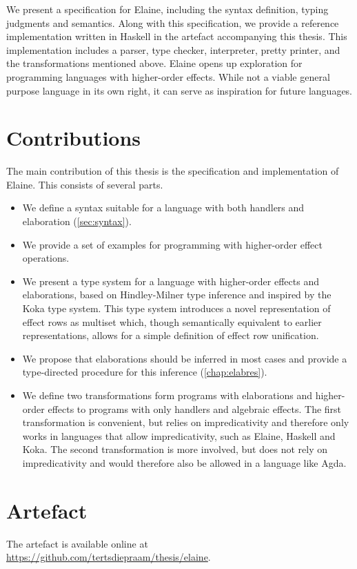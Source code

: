 We present a specification for Elaine, including the syntax definition, typing judgments and semantics. Along with this specification, we provide a reference implementation written in Haskell in the artefact accompanying this thesis. This implementation includes a parser, type checker, interpreter, pretty printer, and the transformations mentioned above. Elaine opens up exploration for programming languages with higher-order effects. While not a viable general purpose language in its own right, it can serve as inspiration for future languages.

\section{Contributions}

The main contribution of this thesis is the specification and implementation of Elaine. This consists of several parts.

\begin{itemize}
    \item We define a syntax suitable for a language with both handlers and elaboration (\cref{sec:syntax}).
    \item We provide a set of examples for programming with higher-order effect operations.
    \item We present a type system for a language with higher-order effects and elaborations, based on Hindley-Milner type inference and inspired by the Koka type system. This type system introduces a novel representation of effect rows as multiset which, though semantically equivalent to earlier representations, allows for a simple definition of effect row unification.
    \item We propose that elaborations should be inferred in most cases and provide a type-directed procedure for this inference (\cref{chap:elabres}).
    \item We define two transformations form programs with elaborations and higher-order effects to programs with only handlers and algebraic effects. The first transformation is convenient, but relies on impredicativity and therefore only works in languages that allow impredicativity, such as Elaine, Haskell and Koka. The second transformation is more involved, but does not rely on impredicativity and would therefore also be allowed in a language like Agda.
\end{itemize}

\section{Artefact}\label{sec:artefact}


The artefact is available online at \url{https://github.com/tertsdiepraam/thesis/elaine}.
